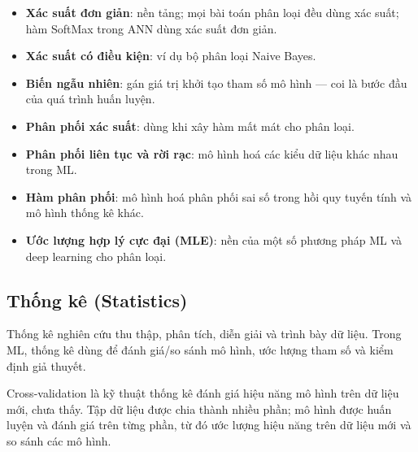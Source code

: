 \begin{phuongphap}[title={Các khái niệm xác suất quan trọng trong ML}]
\begin{itemize}
  \item \textbf{Xác suất đơn giản}: nền tảng; mọi bài toán phân loại đều dùng xác suất; hàm SoftMax trong ANN dùng xác suất đơn giản.
  \item \textbf{Xác suất có điều kiện}: ví dụ bộ phân loại Naive Bayes.
  \item \textbf{Biến ngẫu nhiên}: gán giá trị khởi tạo tham số mô hình --- coi là bước đầu của quá trình huấn luyện.
  \item \textbf{Phân phối xác suất}: dùng khi xây hàm mất mát cho phân loại.
  \item \textbf{Phân phối liên tục và rời rạc}: mô hình hoá các kiểu dữ liệu khác nhau trong ML.
  \item \textbf{Hàm phân phối}: mô hình hoá phân phối sai số trong hồi quy tuyến tính và mô hình thống kê khác.
  \item \textbf{Ước lượng hợp lý cực đại (MLE)}: nền của một số phương pháp ML và deep learning cho phân loại.
\end{itemize}
\end{phuongphap}

\subsection{Thống kê (Statistics)}

\begin{dinhnghia}[title={Thống kê}]
Thống kê nghiên cứu thu thập, phân tích, diễn giải và trình bày dữ liệu.
Trong ML, thống kê dùng để đánh giá/so sánh mô hình, ước lượng tham số và kiểm định giả thuyết.
\end{dinhnghia}

\begin{vidu}[title={Cross-validation}]
Cross-validation là kỹ thuật thống kê đánh giá hiệu năng mô hình trên dữ liệu mới, chưa thấy.
Tập dữ liệu được chia thành nhiều phần; mô hình được huấn luyện và đánh giá trên từng phần, từ đó ước lượng hiệu năng trên dữ liệu mới và so sánh các mô hình.
\end{vidu}

